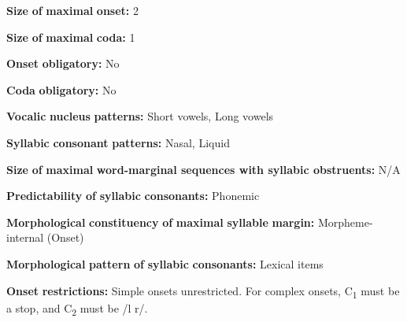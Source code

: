 \begin{styleBody}
\textbf{Size} \textbf{of} \textbf{maximal} \textbf{onset:} 2
\end{styleBody}

\begin{styleBody}
\textbf{Size} \textbf{of} \textbf{maximal} \textbf{coda:} 1
\end{styleBody}

\begin{styleBody}
\textbf{Onset} \textbf{obligatory:} No
\end{styleBody}

\begin{styleBody}
\textbf{Coda} \textbf{obligatory:} No
\end{styleBody}

\begin{styleBody}
\textbf{Vocalic} \textbf{nucleus} \textbf{patterns:} Short vowels, Long vowels
\end{styleBody}

\begin{styleBody}
\textbf{Syllabic} \textbf{consonant} \textbf{patterns:} Nasal, Liquid
\end{styleBody}

\begin{styleBody}
\textbf{Size} \textbf{of} \textbf{maximal} \textbf{word{}-marginal sequences with syllabic obstruents:} N/A
\end{styleBody}

\begin{styleBody}
\textbf{Predictability} \textbf{of} \textbf{syllabic} \textbf{consonants:} Phonemic
\end{styleBody}

\begin{styleBody}
\textbf{Morphological} \textbf{constituency} \textbf{of} \textbf{maximal} \textbf{syllable} \textbf{margin:} Morpheme-internal (Onset)
\end{styleBody}

\begin{styleBody}
\textbf{Morphological} \textbf{pattern} \textbf{of} \textbf{syllabic} \textbf{consonants:} Lexical items
\end{styleBody}

\begin{styleBody}
\textbf{Onset} \textbf{restrictions:} Simple onsets unrestricted. For complex onsets, C\textsubscript{1} must be a stop, and C\textsubscript{2} must be /l r/. 
\end{styleBody}

